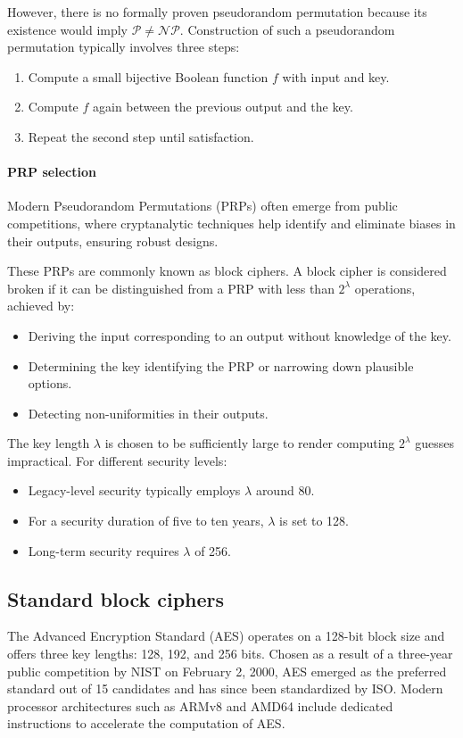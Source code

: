 However, there is no formally proven pseudorandom permutation because its existence would imply $\mathcal{P} \neq \mathcal{NP}$. 
Construction of such a pseudorandom permutation typically involves three steps:
\begin{enumerate}
    \item Compute a small bijective Boolean function $f$ with input and key.
    \item Compute $f$ again between the previous output and the key.
    \item Repeat the second step until satisfaction.
\end{enumerate}

\paragraph*{PRP selection}
Modern Pseudorandom Permutations (PRPs) often emerge from public competitions, where cryptanalytic techniques help identify and eliminate biases in their outputs, ensuring robust designs.

These PRPs are commonly known as block ciphers.
A block cipher is considered broken if it can be distinguished from a PRP with less than $2^\lambda$ operations, achieved by:
\begin{itemize}
    \item Deriving the input corresponding to an output without knowledge of the key.
    \item Determining the key identifying the PRP or narrowing down plausible options.
    \item Detecting non-uniformities in their outputs.
\end{itemize}
The key length $\lambda$ is chosen to be sufficiently large to render computing $2^\lambda$ guesses impractical.
For different security levels:
\begin{itemize}
    \item Legacy-level security typically employs $\lambda$ around 80.
    \item For a security duration of five to ten years, $\lambda$ is set to 128.
    \item Long-term security requires $\lambda$ of 256.
\end{itemize}

\subsection{Standard block ciphers}
The Advanced Encryption Standard (AES) operates on a 128-bit block size and offers three key lengths: 128, 192, and 256 bits.
Chosen as a result of a three-year public competition by NIST on February 2, 2000, AES emerged as the preferred standard out of 15 candidates and has since been standardized by ISO.
Modern processor architectures such as ARMv8 and AMD64 include dedicated instructions to accelerate the computation of AES.

